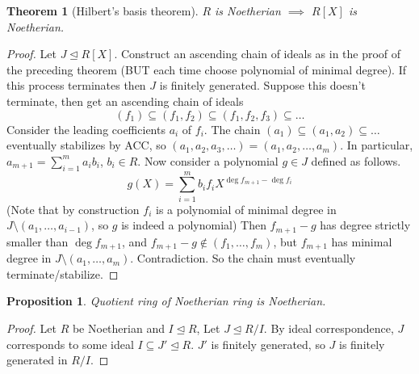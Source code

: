 \documentclass{article}
\theoremstyle{definition}
\theoremstyle{remark}
\theoremstyle{plain}
\newtheorem{thm}[defn]{Theorem}
\newtheorem{prop}[defn]{Proposition}
\theoremstyle{definition}
\begin{document}
\begin{thm}[Hilbert's basis theorem]
    $R$ is Noetherian $\implies$ $R[X]$ is Noetherian.
\end{thm}
\begin{proof}
    Let $J\trianglelefteq R[X]$. Construct an ascending chain of ideals as in the proof of the preceding theorem (BUT each time choose polynomial of minimal degree). If this process terminates then $J$ is finitely generated. Suppose this doesn't terminate, then get an ascending chain of ideals
    \[(f_1)\subseteq(f_1,f_2)\subseteq (f_1,f_2,f_3)\subseteq\ldots\]
    Consider the leading coefficients $a_i$ of $f_i$. The chain $(a_1)\subseteq(a_1,a_2)\subseteq\ldots$ eventually stabilizes by ACC, so $(a_1,a_2,a_3,\ldots)=(a_1,a_2,\ldots,a_m)$. In particular, $a_{m+1}=\sum_{i=1}^m a_ib_i$, $b_i\in R$. Now consider a polynomial $g\in J$ defined as follows.
    \[g(X)=\sum_{i=1}^m b_if_iX^{\deg f_{m+1}-\deg f_i}\]
    (Note that by construction $f_i$ is a polynomial of minimal degree in $J\setminus (a_1,\ldots,a_{i-1})$, so $g$ is indeed a polynomial) Then $f_{m+1}-g$ has degree strictly smaller than $\deg f_{m+1}$, and $f_{m+1}-g\not\in (f_1,\ldots,f_m)$, but $f_{m+1}$ has minimal degree in $J\setminus(a_1,\ldots,a_m)$. Contradiction. So the chain must eventually terminate/stabilize.
\end{proof}
\begin{prop}
    Quotient ring of Noetherian ring is Noetherian.
\end{prop}
\begin{proof}
    Let $R$ be Noetherian and $I\trianglelefteq R$, Let $J\trianglelefteq R/I$. By ideal correspondence, $J$ corresponds to some ideal $I\subseteq J'\trianglelefteq R$. $J'$ is finitely generated, so $J$ is finitely generated in $R/I$.
\end{proof}
\end{document}
